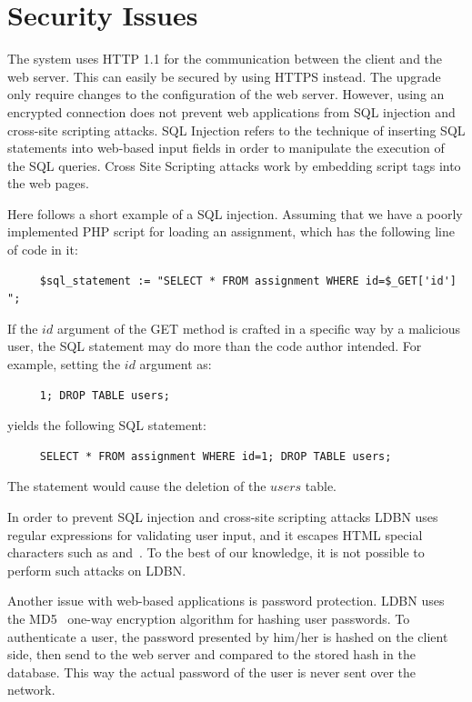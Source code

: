 \section{Security Issues}
The system uses HTTP 1.1 for the communication between the client and the web
server. This can easily be secured by using HTTPS instead. The upgrade only
require changes to the configuration of the web server. However, using an encrypted
connection does not prevent web applications from SQL injection and cross-site 
scripting attacks. SQL Injection refers to the technique of 
inserting SQL statements into web-based input fields in 
order to manipulate the execution of the SQL queries. Cross Site Scripting 
attacks work by embedding script tags into the web pages. 

Here follows a short example of a SQL injection.
Assuming that we have a poorly implemented PHP script for loading an assignment,
which has the following line of code in it:

\begin{verbatim}
     $sql_statement := "SELECT * FROM assignment WHERE id=$_GET['id'] ";
\end{verbatim}

\noindent If the $id$ argument of the GET method is crafted in a specific way by a 
malicious user, the SQL statement may do more than the code author intended. 
For example, setting the $id$ argument as:

\begin{verbatim}
     1; DROP TABLE users;
\end{verbatim}

\noindent yields the following SQL statement:

\begin{verbatim}
     SELECT * FROM assignment WHERE id=1; DROP TABLE users;
\end{verbatim}

\noindent The statement would cause the deletion of the $users$ table. 

In order to prevent SQL injection and cross-site 
scripting attacks LDBN uses regular expressions for validating
user input, and it escapes HTML special characters such as \lt and~\gt.
To the best of our knowledge, it is not possible to perform such attacks on LDBN.

Another issue with web-based applications is password protection. LDBN uses the 
MD5~\cite{w7} one-way encryption algorithm for hashing user passwords. 
To authenticate a user, the password presented by him/her is hashed on the client side, 
then send to the web server and compared to the stored hash in the database. 
This way the actual password of the user is never sent over the network.
